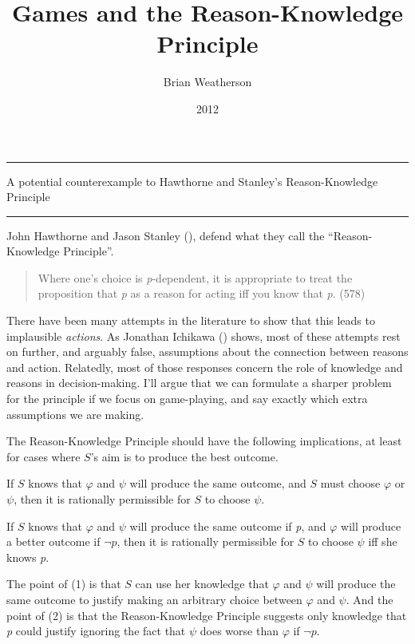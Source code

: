 \documentclass[
  10pt,
  letterpaper,
  DIV=11,
  numbers=noendperiod,
  twoside]{scrartcl}
\title{Games and the Reason-Knowledge Principle}
\author{Brian Weatherson}
\date{2012}
\providecommand{\tightlist}{%
  \setlength{\itemsep}{0pt}\setlength{\parskip}{0pt}}\usepackage{longtable,booktabs,array}
\renewenvironment{abstract}
 {\vspace{-1.25cm}
 \quotation\small\noindent\rule{\linewidth}{.5pt}\par\smallskip
 \noindent }
 {\par\noindent\rule{\linewidth}{.5pt}\endquotation}
\begin{document}
\maketitle
\begin{abstract}
A potential counterexample to Hawthorne and Stanley's Reason-Knowledge
Principle
\end{abstract}

John Hawthorne and Jason Stanley
(), defend what they call the
``Reason-Knowledge Principle''.

\begin{quote}
Where one's choice is \emph{p}-dependent, it is appropriate to treat the
proposition that \emph{p} as a reason for acting iff you know that
\emph{p}. (578)
\end{quote}

There have been many attempts in the literature to show that this leads
to implausible \emph{actions}. As Jonathan Ichikawa
() shows, most of these attempts rest
on further, and arguably false, assumptions about the connection between
reasons and action. Relatedly, most of those responses concern the role
of knowledge and reasons in decision-making. I'll argue that we can
formulate a sharper problem for the principle if we focus on
game-playing, and say exactly which extra assumptions we are making.

The Reason-Knowledge Principle should have the following implications,
at least for cases where \(S\)'s aim is to produce the best outcome.

\begin{description}
\tightlist
\item[(1)]
If \(S\) knows that \(\varphi\) and \(\psi\) will produce the same
outcome, and \(S\) must choose \(\varphi\) or \(\psi\), then it is
rationally permissible for \(S\) to choose \(\psi\).
\item[(2)]
If \(S\) knows that \(\varphi\) and \(\psi\) will produce the same
outcome if \emph{p}, and \(\varphi\) will produce a better outcome if
\(\neg p\), then it is rationally permissible for \(S\) to choose
\(\psi\) iff she knows \emph{p}.
\end{description}

The point of (1) is that \(S\) can use her knowledge that \(\varphi\)
and \(\psi\) will produce the same outcome to justify making an
arbitrary choice between \(\varphi\) and \(\psi\). And the point of (2)
is that the Reason-Knowledge Principle suggests only knowledge that
\emph{p} could justify ignoring the fact that \(\psi\) does worse than
\(\varphi\) if \(\neg p\).
\end{document}
